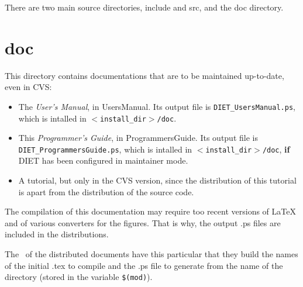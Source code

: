 

There are two main source directories, \textsf{include} and \textsf{src}, and
the \textsf{doc} directory.


\section{\textsf{doc}}
\label{s:doc}

This directory contains documentations that are to be maintained up-to-date, even in CVS:

\begin{itemize}
\item The \textit{User's Manual}, in \textsf{UsersManual}. Its output file is
  \texttt{DIET\_UsersManual.ps}, which is intalled in
  \texttt{$<$install\_dir$>$/doc}.
\item This \textit{Programmer's Guide}, in \textsf{ProgrammersGuide}. Its output
  file is \texttt{DIET\_ProgrammersGuide.ps}, which is intalled in
  \texttt{$<$install\_dir$>$/doc}, \textbf{if} DIET has been configured in
  maintainer mode.
\item A tutorial, but only in the CVS version, since the distribution of this
  tutorial is apart from the distribution of the source code.
\end{itemize}

The compilation of this documentation may require too recent versions of \LaTeX
and of various converters for the figures. That is why, the output \textsf{.ps}
files are included in the distributions.


The \makeam\ of the distributed documents have this particular that they build
the names of the initial \textsf{.tex} to compile and the \textsf{.ps} file to
generate from the name of the directory (stored in the variable \verb+$(mod)+).

